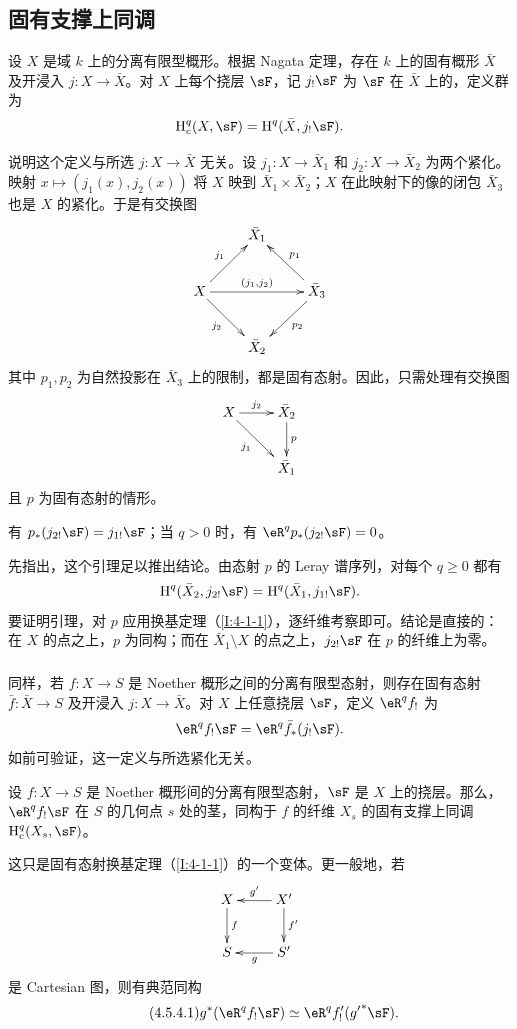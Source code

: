 \subsection{固有支撑上同调}\label{I:4-5}
\begin{definition}\label{I:4-5-1}
设 $X$ 是域 $k$ 上的分离有限型概形。根据 Nagata 定理，存在 $k$ 上的固有概形 $\bar X$ 及开浸入 $j:X\to\bar X$。对 $X$ 上每个挠层 $\sF$，记 $j_!\sF$ 为 $\sF$ 在 $\bar X$ 上的，定义群为
\[
\h_c^q(X,\sF)=\h^q(\bar X,j_!\sF).
\]
\end{definition}
说明这个定义与所选 $j:X\to\bar X$ 无关。设 $j_1:X\to\bar X_1$ 和 $j_2:X\to\bar X_2$ 为两个紧化。映射 $x\mapsto(j_1(x),j_2(x))$ 将 $X$ 映到 $\bar X_1\times\bar X_2$；$X$ 在此映射下的像的闭包 $\bar X_3$ 也是 $X$ 的紧化。于是有交换图
\[\xymatrix{
&\bar X_1\\
X\ar[ur]^-{j_1}\ar[rr]^-{(j_1,j_2)}\ar[dr]_-{j_2}&&\bar X_3\ar[ul]_-{p_1}\ar[dl]^-{p_2}\\
&\bar X_2
}\]
其中 $p_1,p_2$ 为自然投影在 $\bar X_3$ 上的限制，都是固有态射。因此，只需处理有交换图
\[\xymatrix{
X\ar[r]^-{j_2}\ar[dr]_-{j_1}&\bar X_2\ar[d]^-p\\
&\bar X_1
}\]
且 $p$ 为固有态射的情形。
\begin{lemma}\label{I:4-5-2}
有 $p_*(j_{2!}\sF)=j_{1!}\sF$；当 $q>0$ 时，有 $\eR^qp_*(j_{2!}\sF)=0$。
\end{lemma}
先指出，这个引理足以推出结论。由态射 $p$ 的 Leray 谱序列，对每个 $q\geqslant0$ 都有
\[
\h^q(\bar X_2,j_{2!}\sF)=\h^q(\bar X_1,j_{1!}\sF).
\]
要证明引理，对 $p$ 应用换基定理（\ref{I:4-1-1}），逐纤维考察即可。结论是直接的：在 $X$ 的点之上，$p$ 为同构；而在 $\bar X_1\setminus X$ 的点之上，$j_{2!}\sF$ 在 $p$ 的纤维上为零。
\subsubsection{}\label{I:4-5-3}
同样，若 $f:X\to S$ 是 Noether 概形之间的分离有限型态射，则存在固有态射 $\bar f:\bar X\to S$ 及开浸入 $j:X\to\bar X$。对 $X$ 上任意挠层 $\sF$，定义 $\eR^qf_!$ 为
\[
\eR^qf_!\sF=\eR^q\bar f_*(j_!\sF).
\]
如前可验证，这一定义与所选紧化无关。
\begin{theorem}\label{I:4-5-4}
设 $f:X\to S$ 是 Noether 概形间的分离有限型态射，$\sF$ 是 $X$ 上的挠层。那么，$\eR^qf_!\sF$ 在 $S$ 的几何点 $s$ 处的茎，同构于 $f$ 的纤维 $X_s$ 的固有支撑上同调 $\h_c^q(X_s,\sF)$。
\end{theorem}
这只是固有态射换基定理（\ref{I:4-1-1}）的一个变体。更一般地，若
\[\xymatrix{
X\ar[d]^-f&X'\ar[l]_-{g'}\ar[d]^-{f'}\\
S&S'\ar[l]^-g
}\]
是 Cartesian 图，则有典范同构
\begin{equation*}\tag{4.5.4.1}\label{I:eq:4-5-4-1}
g^*(\eR^qf_!\sF)\simeq\eR^qf'_!({g'}^*\sF).
\end{equation*}

